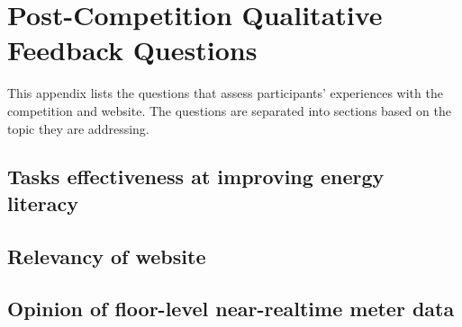 
\chapter{Post-Competition Qualitative Feedback Questions}
\label{app:qualitative-feedback}

This appendix lists the questions that assess participants' experiences with the competition and website. The questions are separated into sections based on the topic they are addressing.

\section{Tasks effectiveness at improving energy literacy}

\section{Relevancy of website}

\section{Opinion of floor-level near-realtime meter data}